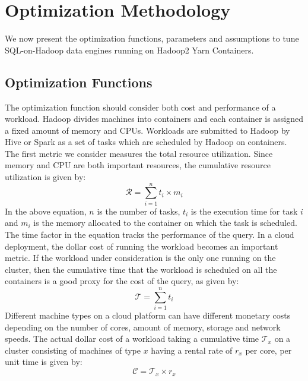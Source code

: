 \section{Optimization Methodology}
\label{sec:optmethod}
We now present the optimization functions, parameters and assumptions to tune SQL-on-Hadoop data engines running on Hadoop2 Yarn Containers. 

\subsection{Optimization Functions}
The optimization function should consider both cost and performance of a workload.  Hadoop divides machines into containers and each container is assigned a fixed amount of memory and CPUs. Workloads are submitted to Hadoop by Hive or Spark as a set of tasks which are scheduled by Hadoop on containers. The first metric we consider measures the total resource utilization. Since memory and CPU are both important resources, the cumulative resource utilization is given by:
\begin{equation}
\label{eqn:totalresource}
\mathcal{R} = \sum_{i=1}^{n} t_i \times m_i
\end{equation}
In the above equation, $n$ is the number of tasks, $t_i$ is the execution time for task $i$ and $m_i$ is the memory allocated to the container on which the task is scheduled. The time factor in the equation tracks the performance of the query. In a cloud deployment, the dollar cost of running the workload becomes an important metric. If the workload under consideration is the only one running on the cluster, then the cumulative time that the workload is scheduled on all the containers is a good proxy for the cost of the query, as given by:
\begin{equation}
\label{eqn:totaltime}
\mathcal{T} = \sum_{i=1}^{n} t_i
\end{equation}
Different machine types on a cloud platform can have different monetary costs depending on the number of cores, amount of memory, storage and network speeds. The actual dollar cost of a workload taking a cumulative time $\mathcal{T}_x$ on a cluster consisting of machines of type $x$ having a rental rate of $r_x$ per core, per unit time is given by:
\begin{equation}
\label{eqn:totalcost}
\mathcal{C} = \mathcal{T}_x \times r_x
\end{equation}


